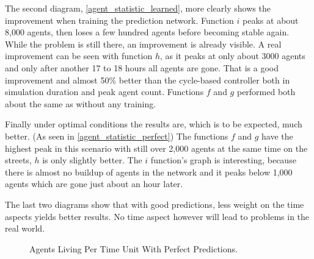 The second diagram, \autoref{agent_statistic_learned}, more clearly shows the improvement when training the prediction network. Function $i$ peaks at about 8,000 agents, then loses a few hundred agents before becoming stable again. While the problem is still there, an improvement is already visible. A real improvement can be seen with function $h$, as it peaks at only about 3000 agents and only after another 17 to 18 hours all agents are gone. That is a good improvement and almost 50\% better than the cycle-based controller both in simulation duration and peak agent count. Functions $f$ and $g$ performed both about the same as without any training.

Finally under optimal conditions the results are, which is to be expected, much better. (As seen in \autoref{agent_statistic_perfect}) The functions $f$ and $g$ have the highest peak in this scenario with still over 2,000 agents at the same time on the streets, $h$ is only slightly better. The $i$ function's graph is interesting, because there is almost no buildup of agents in the network and it peaks below 1,000 agents which are gone just about an hour later.

The last two diagrams show that with good predictions, less weight on the time aspects yields better results. No time aspect however will lead to problems in the real world. 

\begin{figure}[bt!]
	\centering
	\caption{Agents Living Per Time Unit With Perfect Predictions.}
	\label{agent_statistic_perfect}
\end{figure}

